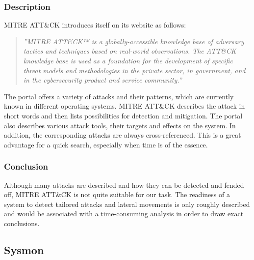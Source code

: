 \subsubsection{Description}
MITRE ATT\&CK introduces itself on its website as follows:
\begin{quotation}
    \textit{''MITRE ATT\&CK™ is a globally-accessible knowledge base of adversary tactics and techniques based on real-world observations. The ATT\&CK knowledge base is used as a foundation for the development of specific threat models and methodologies in the private sector, in government, and in the cybersecurity product and service community.'' \cite{MITRE}} 
\end{quotation}
The portal offers a variety of attacks and their patterns, which are currently known in different operating systems. MITRE ATT\&CK describes the attack in short words and then lists possibilities for detection and mitigation. The portal also describes various attack tools, their targets and effects on the system. In addition, the corresponding attacks are always cross-referenced. This is a great advantage for a quick search, especially when time is of the essence.

\subsubsection{Conclusion}
Although many attacks are described and how they can be detected and fended off, MITRE ATT\&CK is not quite suitable for our task. The readiness of a system to detect tailored attacks and lateral movements is only roughly described and would be associated with a time-consuming analysis in order to draw exact conclusions.

\clearpage

\subsection{Sysmon}
